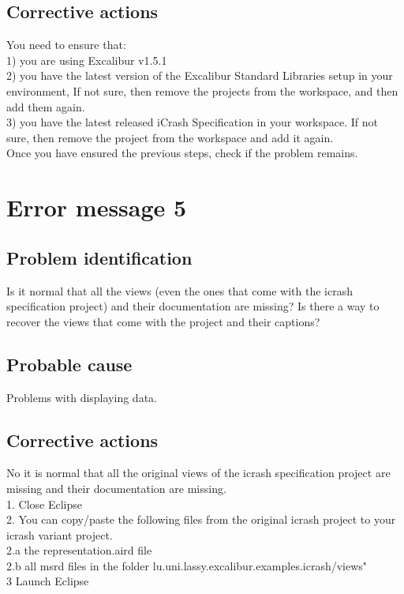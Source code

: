 \subsection{Corrective actions}
You need to ensure that:\\
1) you are using Excalibur v1.5.1\\
2) you have the latest version of the Excalibur Standard Libraries setup in your
environment, If not sure, then remove the projects from the workspace, and then
add them again.\\ 3) you have the latest released iCrash Specification in your
workspace. If not sure, then remove the project from the workspace and add it
again. \\
Once you have ensured the previous steps, check if the problem remains.


\section{Error message 5}

\subsection{Problem identification}
Is it normal that all the views (even the ones that come with the icrash
specification project) and their documentation are missing? Is there a way to recover the views that come with the project and their captions?

\subsection{Probable cause}
Problems with displaying data.

\subsection{Corrective actions}
No it is normal that all the original views of the icrash specification project
are missing and their documentation are missing.\\
1. Close Eclipse\\
2. You can copy/paste the following files from the original icrash project to
your icrash variant project.\\
2.a the representation.aird file\\
2.b all msrd files in the folder lu.uni.lassy.excalibur.examples.icrash/views"\\
3 Launch Eclipse\\

